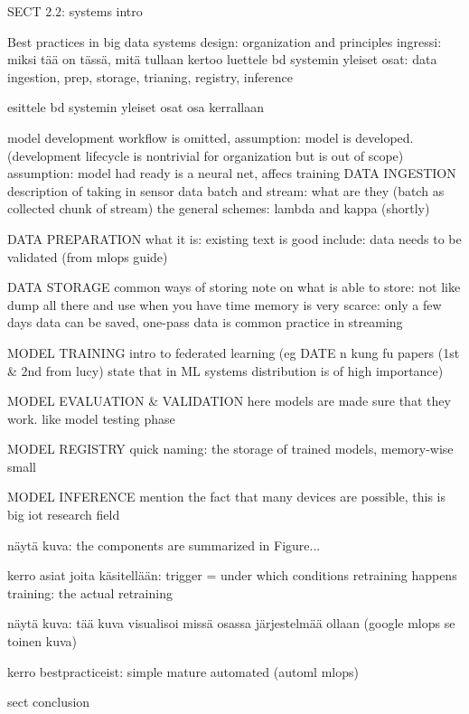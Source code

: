SECT 2.2: systems intro

Best practices in big data systems design: organization and principles
ingressi: miksi tää on tässä, mitä tullaan kertoo
luettele bd systemin yleiset osat: data ingestion, prep, storage, trianing, registry, inference

esittele bd systemin yleiset osat osa kerrallaan

	model development workflow is omitted, assumption: model is developed. (development lifecycle is nontrivial for organization but is out of scope) assumption: model had ready is a neural net, affecs training
	DATA INGESTION
	description of taking in sensor data
	batch and stream: what are they (batch as collected chunk of stream)
	the general schemes: lambda and kappa (shortly)

	DATA PREPARATION
	what it is: existing text is good
	include: data needs to be validated (from mlops guide)

	DATA STORAGE
	common ways of storing
	note on what is able to store: 
		not like dump all there and use when you have time
		memory is very scarce: only a few days data can be saved, one-pass data is common practice in streaming
		
	MODEL TRAINING
	intro to federated learning
	(eg DATE n kung fu papers (1st & 2nd from lucy) state that in ML systems distribution is of high importance)
	
	MODEL EVALUATION & VALIDATION
	here models are made sure that they work. like model testing phase

	MODEL REGISTRY
	quick naming: the storage of trained models, memory-wise small

	MODEL INFERENCE
	mention the fact that many devices are possible, this is big iot research field

näytä kuva: the components are summarized in Figure...

kerro asiat joita käsitellään: trigger = under which conditions retraining happens
training: the actual retraining

näytä kuva: tää kuva visualisoi missä osassa järjestelmää ollaan (google mlops se toinen kuva)

kerro bestpracticeist: simple mature automated (automl mlops)

sect conclusion